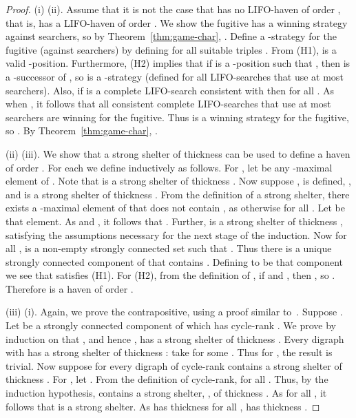 \documentclass{llncs}
\begin{document}
\begin{proof}
(i)  (ii).  Assume that it is not the case that  has no LIFO-haven of order , that is,  has a LIFO-haven  of order .  We show the fugitive has a winning strategy against  searchers, so by Theorem~\ref{thm:game-char}, .  Define a -strategy  for the fugitive (against  searchers) by defining  for all suitable triples .  From (H1),  is a valid -position.  Furthermore, (H2) implies that if  is a -position such that , then  is a -successor of , so  is a -strategy (defined for all LIFO-searches that use at most  searchers).  Also,  if  is a complete LIFO-search consistent with  then  for all .  As  when , it follows that all consistent complete LIFO-searches that use at most  searchers are winning for the fugitive.  Thus  is a winning strategy for the fugitive, so .  By Theorem~\ref{thm:game-char}, .

(ii)  (iii).  We show that a strong shelter  of thickness  can be used to define a haven of order .  For each  we define  inductively as follows.  For , let  be any -maximal element of .  Note that  is a strong shelter of thickness .  Now suppose ,  is defined, , and  is a strong shelter of thickness .  From the definition of a strong shelter, there exists a -maximal element of  that does not contain , as otherwise  for all .  Let  be that element.  As  and , it follows that .  Further,  is a strong shelter of thickness , satisfying the assumptions necessary for the next stage of the induction.  
Now for all ,  is a non-empty strongly connected set such that .  Thus there is a unique strongly connected component of  that contains .  Defining  to be that component we see that  satisfies (H1).  For (H2), from the definition of , if  and , then , so .  Therefore  is a haven of order .

(iii)  (i).  Again, we prove the contrapositive, using a proof similar to~\cite{GT11}.  Suppose .  Let  be a strongly connected component of  which has cycle-rank .
We prove by induction on  that , and hence , has a strong shelter of thickness .  Every digraph with  has a strong shelter of thickness : take  for some .  Thus for , the result is trivial.  Now suppose for  every digraph of cycle-rank  contains a strong shelter of thickness .  For , let .  From the definition of cycle-rank,  for all .  Thus, by the induction hypothesis,  contains a strong shelter, , of thickness .  As  for all , it follows that  is a strong shelter.  As  has thickness  for all ,  has thickness .
\end{proof}
\end{document}
